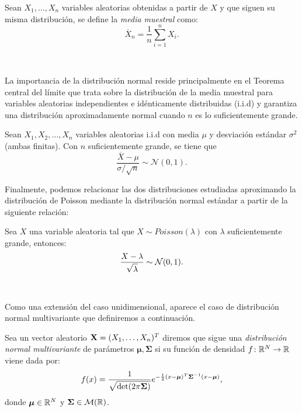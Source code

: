 \documentclass[oneside,openright,titlepage,numbers=noenddot,openany,headinclude,footinclude=true,
cleardoublepage=empty,abstractoff,BCOR=5mm,paper=a4,fontsize=12pt,main=spanish]{scrreprt}
\begin{document}
\begin{definition}
Sean $X_1,\dots,X_n$ variables aleatorias obtenidas a partir de $X$ y que siguen su misma distribución, se define la \textit{media muestral} como:
$$\overline{X}_n=\frac{1}{n}\sum_{i=1}^n X_i.$$
\end{definition}\

La importancia de la distribución normal reside principalmente en el Teorema central del límite que trata sobre la distribución de la media muestral para variables aleatorias independientes e idénticamente distribuidas (i.i.d) y garantiza una distribución aproximadamente normal cuando $n$ es lo suficientemente grande.\\

\begin{theorem} \label{th:thcentral}
Sean $X_1,X_2,\dots,X_n$ variables aleatorias i.i.d con media $\mu$ y desviación estándar $\sigma^2$ (ambas finitas). Con $n$ suficientemente grande, se tiene que $$\frac{\overline{X}-\mu}{\sigma / \sqrt{n}}\sim \mathcal{N}(0,1).$$
\end{theorem}

\clearpage

Finalmente, podemos relacionar las dos distribuciones estudiadas aproximando la distribución de Poisson mediante la distribución normal estándar a partir de la siguiente relación:\\

\begin{proposition}
Sea $X$ una variable aleatoria tal que $X \sim Poisson(\lambda)$ con $\lambda$ suficientemente grande, entonces: $$\frac{\displaystyle X-\lambda}{\displaystyle \sqrt{\lambda}}\sim \mathcal{N}(0,1).$$
\end{proposition}\

Como una extensión del caso unidimensional, aparece el caso de distribución normal multivariante que definiremos a continuación.\\

\begin{definition}
Sea un vector aleatorio $\textbf{X}=(X_1,\dots,X_n)^T$ diremos que sigue una \textit{distribución normal multivariante} de parámetros $\bm{\mu},\bm{\Sigma}$ si su función de densidad $f\colon \mathbb{R}^N \to \mathbb{R}$ viene dada por: $$f(x)=\frac{\displaystyle 1}{\displaystyle \sqrt{\text{det}(2\pi \bm{\Sigma})}}e^{-\frac{1}{2}(x-\bm{\mu})^T\bm{\Sigma}^{-1}(x-\bm{\mu})},$$
donde $\bm{\mu}\in \mathbb{R}^N$ y $\bm{\Sigma}\in \mathcal{M}(\mathbb{R})$.
\end{definition}\
\end{document}
